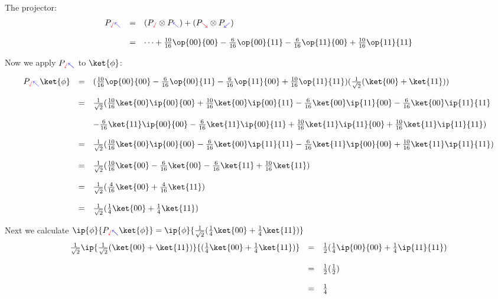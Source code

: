 \documentclass{article}
\newcommand{\yplus}{{\color{blue}\nwarrow}}
\newcommand{\yminus}{{\color{blue}\swarrow}}
\newcommand{\zplus}{{\color{red}\sswarrow}}
\newcommand{\zminus}{{\color{red}\searrow}}
\theoremstyle{remark}
\def\srtt{\frac{1}{\sqrt{2}}}
\begin{document}
The projector:
\[\begin{array}{rcl}
P_{\zplus\yplus} 
        &=& (P_{\zplus}\otimes P_{\yplus}) + (P_{\zminus} \otimes P_{\yminus}) 
        \\ \\
        &=& \dots 
        + \frac{10}{16} \op{00}{00}
        - \frac{6}{16} \op{00}{11}
        - \frac{6}{16} \op{11}{00}
        + \frac{10}{16} \op{11}{11}
    \end{array}
\]

Now we apply $P_{\zplus\yplus}$ to $\ket{\phi}$:

\[
    \begin{array}{rcl}
        P_{\zplus\yplus}\ket{\phi} 
        &=& 
        (\frac{10}{16} \op{00}{00}
        - \frac{6}{16} \op{00}{11}
        - \frac{6}{16} \op{11}{00}
        + \frac{10}{16} \op{11}{11})(\srtt(\ket{00} + \ket{11}))
        \\ \\
        &=& \srtt(
        \frac{10}{16} \ket{00}\ip{00}{00}
        + \frac{10}{16} \ket{00}\ip{00}{11}
        - \frac{6}{16} \ket{00}\ip{11}{00}
        - \frac{6}{16} \ket{00}\ip{11}{11}
        \\ \\
        && 
        - \frac{6}{16} \ket{11}\ip{00}{00}
        - \frac{6}{16} \ket{11}\ip{00}{11}
        + \frac{10}{16} \ket{11}\ip{11}{00}
        + \frac{10}{16} \ket{11}\ip{11}{11}
        )
        \\ \\
        &=& \srtt(
        \frac{10}{16} \ket{00}\ip{00}{00}
        - \frac{6}{16} \ket{00}\ip{11}{11}
        - \frac{6}{16} \ket{11}\ip{00}{00}
        + \frac{10}{16} \ket{11}\ip{11}{11}
        )
        \\ \\
        &=& \srtt(
        \frac{10}{16} \ket{00}
        - \frac{6}{16} \ket{00}
        - \frac{6}{16} \ket{11}
        + \frac{10}{16} \ket{11}
        )
        \\ \\
        &=& \srtt( \frac{4}{16} \ket{00} + \frac{4}{16} \ket{11})
        \\ \\
        &=& \srtt( \frac{1}{4} \ket{00} + \frac{1}{4} \ket{11})
    \end{array}
\]

Next we calculate 
$\ip{\phi}{P_{\zplus\yplus}\ket{\phi}} = \ip{\phi}{\srtt( \frac{1}{4} \ket{00} + \frac{1}{4} \ket{11})}$
\[
    \begin{array}{rcl}
        \srtt\ip{\srtt(\ket{00} + \ket{11})}{(\frac{1}{4} \ket{00} + \frac{1}{4} \ket{11})}
        &=& \frac{1}{2}(\frac{1}{4}\ip{00}{00} + \frac{1}{4}\ip{11}{11})
        \\ \\
        &=& \frac{1}{2}(\frac{1}{2})
        \\ \\
        &=& \frac{1}{4}
    \end{array}
\]
\end{document}
